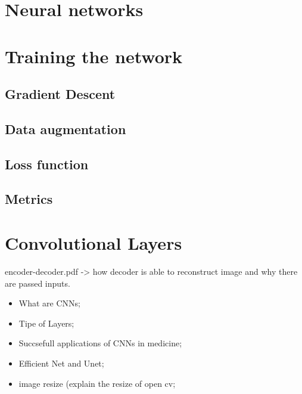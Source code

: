 \documentclass[../main.tex]{subfiles}
\begin{document}
\section{Neural networks}
\section{Training the network}
\subsection{Gradient Descent}
\subsection{Data augmentation}
\subsection{Loss function}
\subsection{Metrics}
\section{Convolutional Layers}


encoder-decoder.pdf  -> how decoder is able to reconstruct image and why there are passed inputs.



\begin{itemize}

    \item What are CNNs;
    \item Tipe of Layers;
    \item Succsefull applications of CNNs in medicine;
    \item Efficient Net and Unet;
   \item image resize (explain the resize of open cv;
\end{itemize}
\end{document}
